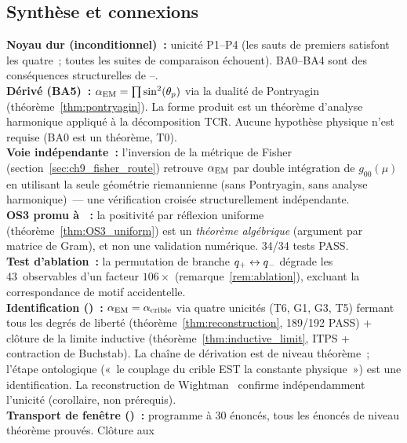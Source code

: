 \documentclass[12pt,a4paper]{article}
\begin{document}
\subsection{Synthèse et connexions}
\label{sec:ch9_summary}

\begin{ledgerbox}
\textbf{Noyau dur (inconditionnel)~:} unicité P1--P4 (les sauts de
  premiers satisfont les quatre~; toutes les suites de comparaison
  échouent). BA0--BA4 sont des conséquences structurelles de
  \cite{companion_M1}--\cite{companion_M3}.\\[4pt]
\textbf{Dérivé (BA5)~:} $\alpha_{\mathrm{EM}} = \prod \sin^2(\theta_{p})$ via la dualité
  de Pontryagin (théorème~\ref{thm:pontryagin}). La forme produit
  est un théorème d'analyse harmonique appliqué à la décomposition
  TCR. Aucune hypothèse physique n'est requise (BA0 est un
  théorème, T0).\\[4pt]
\textbf{Voie indépendante~:} l'inversion de la métrique de Fisher
  (section~\ref{sec:ch9_fisher_route}) retrouve $\alpha_{\mathrm{EM}}$ par
  double intégration de $g_{00}(\mu)$ en utilisant la seule
  géométrie riemannienne (sans Pontryagin, sans analyse
  harmonique)~--- une vérification croisée structurellement
  indépendante.\\[4pt]
\textbf{OS3 promu à \THMTAG~:} la positivité par réflexion
  uniforme (théorème~\ref{thm:OS3_uniform}) est un \emph{théorème
  algébrique} (argument par matrice de Gram), et non une
  validation numérique. 34/34 tests PASS.\\[4pt]
\textbf{Test d'ablation~:} la permutation de branche
  $q_{+} \leftrightarrow q_{-}$ dégrade les 43~observables d'un
  facteur $106\times$ (remarque~\ref{rem:ablation}), excluant la
  correspondance de motif accidentelle.\\[4pt]
\textbf{Identification (\BRIDGETAG)~:}
  $\alpha_{\mathrm{EM}} = \alpha_{\rm crible}$ via quatre unicités (T6, G1,
  G3, T5) fermant tous les degrés de liberté
  (théorème~\ref{thm:reconstruction}, 189/192 PASS) + clôture de
  la limite inductive (théorème~\ref{thm:inductive_limit}, ITPS +
  contraction de Buchstab). La chaîne de dérivation est de niveau
  théorème~; l'étape ontologique («~le couplage du crible EST la
  constante physique~») est une identification. La reconstruction
  de Wightman~\cite{StreaterWightman1964} confirme indépendamment
  l'unicité (corollaire, non prérequis).\\[4pt]
\textbf{Transport de fenêtre (\THMTAG)~:} programme à 30 énoncés,
  tous les énoncés de niveau théorème prouvés. Clôture aux

\end{ledgerbox}
\end{document}
